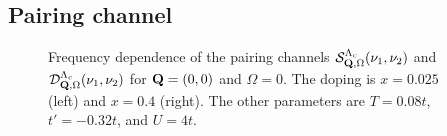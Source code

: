 \begin{widetext}
\section{Pairing channel}
\label{sec:appPairingChannel}

\begin{figure}[tbh]
\caption{Frequency dependence of the pairing channels
 $\mathcal{S}^{\Lambda_c}_{\mathbf{Q},\Omega}(\nu_1,\nu_2)$ and
 $\mathcal{D}^{\Lambda_c}_{\mathbf{Q},\Omega}(\nu_1,\nu_2)$ for $\mathbf{Q}=(0,0)$ and $\Omega=0$.
 The doping is $x=0.025$ (left) and $x=0.4$ (right). The other parameters are $T=0.08t$, $t'=-0.32t$, and $U=4t$.}
\label{fig:pairing}
\end{figure}


\end{widetext}
